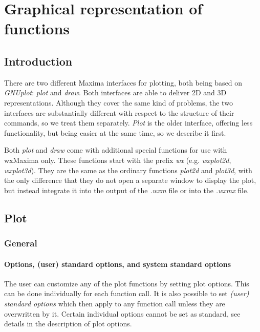 \documentclass[../Maxima_Workbook.tex]{subfiles}
\begin{document}
	
\chapter{Graphical representation of functions}

\section{Introduction}

There are two different Maxima interfaces for plotting, both being based on \emph{GNUplot}: \emph{plot} and \emph{draw}. Both interfaces are able to deliver 2D and 3D representations. Although they cover the same kind of problems, the two interfaces are substantially different with respect to the structure of their commands, so we treat them separately. \emph{Plot} is the older interface, offering less functionality, but being easier at the same time, so we describe it first.

\lz Both \emph{plot} and \emph{draw} come with additional special functions for use with wxMaxima only. These functions start with the prefix \emph{wx} (e.g. \emph{wxplot2d}, \emph{wxplot3d}). They are the same as the ordinary functions \emph{plot2d} and \emph{plot3d}, with the only difference that they do not open a separate window to display the plot, but instead integrate it into the output of the \emph{.wxm} file or into the \emph{.wxmx} file.

\section{Plot}

\subsection{General}

\subsubsection{Options, (user) standard options, and system standard options}

The user can customize any of the plot functions by setting plot options. This can be done individually for each function call. It is also possible to set \emph{(user) standard options} which then apply to any function call unless they are overwritten by it. Certain individual options cannot be set as standard, see details in the description of plot options.
\end{document}
